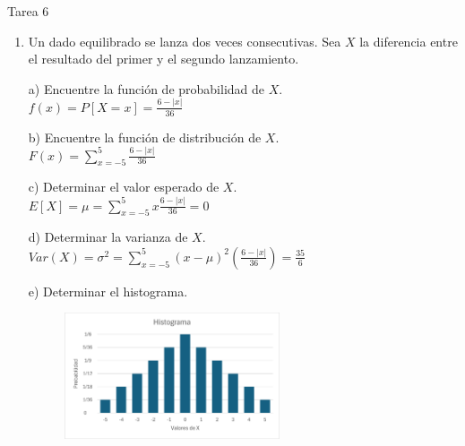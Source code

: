 \documentclass[a4paper, 12pt]{article}
\newcommand{\Aspace}{0.2cm}
\begin{document}
\newpage
\begin{center}
    { \LARGE Tarea 6}
\end{center}

\begin{enumerate}
    \item Un dado equilibrado se lanza dos veces consecutivas. Sea $X$ la diferencia entre el resultado del primer y el segundo lanzamiento.
    \vspace{\Aspace} \par
    a) Encuentre la función de probabilidad de $X$.
    \\ { \color{azul} $f(x) = P[X = x] = \frac{6 - |x|}{36}$ }

    \vspace{\Aspace} \par
    b) Encuentre la función de distribución de $X$.
    \\ { \color{azul} $F(x) = \sum\limits_{x = -5}^{5} \frac{6 - |x|}{36}$ }

    \vspace{\Aspace} \par
    c) Determinar el valor esperado de $X$.
    \\ { \color{azul} $E[X] = \mu = \sum\limits_{x = -5}^{5} x\frac{6 - |x|}{36} = 0$ }

    \vspace{\Aspace} \par
    d) Determinar la varianza de $X$.
    \\ { \color{azul} $Var(X) = \sigma^{2} = \sum\limits_{x = -5}^{5} (x - \mu)^{2} (\frac{6 - |x|}{36}) = \frac{35}{6}$ }

    \vspace{\Aspace} \par
    e) Determinar el histograma.
    \begin{figure}[h]
        \centering
        \includegraphics[width=0.6\textwidth]{./Assets/HistogramaT6P1.png}
    \end{figure}


\end{enumerate}
\end{document}
